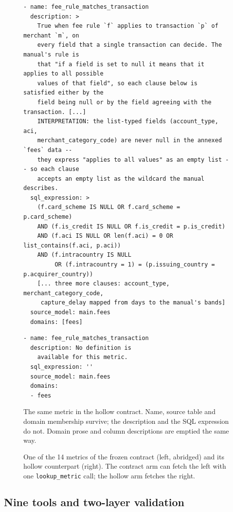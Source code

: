 \begin{figure}[t]
\begin{minipage}[t]{0.63\textwidth}
\begin{lstlisting}
- name: fee_rule_matches_transaction
  description: >
    True when fee rule `f` applies to transaction `p` of merchant `m`, on
    every field that a single transaction can decide. The manual's rule is
    that "if a field is set to null it means that it applies to all possible
    values of that field", so each clause below is satisfied either by the
    field being null or by the field agreeing with the transaction. [...]
    INTERPRETATION: the list-typed fields (account_type, aci,
    merchant_category_code) are never null in the annexed `fees` data --
    they express "applies to all values" as an empty list -- so each clause
    accepts an empty list as the wildcard the manual describes.
  sql_expression: >
    (f.card_scheme IS NULL OR f.card_scheme = p.card_scheme)
    AND (f.is_credit IS NULL OR f.is_credit = p.is_credit)
    AND (f.aci IS NULL OR len(f.aci) = 0 OR list_contains(f.aci, p.aci))
    AND (f.intracountry IS NULL
         OR (f.intracountry = 1) = (p.issuing_country = p.acquirer_country))
    [... three more clauses: account_type, merchant_category_code,
     capture_delay mapped from days to the manual's bands]
  source_model: main.fees
  domains: [fees]
\end{lstlisting}
\end{minipage}\hfill
\begin{minipage}[t]{0.35\textwidth}
\begin{lstlisting}
- name: fee_rule_matches_transaction
  description: No definition is
    available for this metric.
  sql_expression: ''
  source_model: main.fees
  domains:
  - fees
\end{lstlisting}
\vspace{2pt}
{\small The same metric in the hollow contract. Name, source table and
domain membership survive; the description and the SQL expression do not.
Domain prose and column descriptions are emptied the same way.}
\end{minipage}
\caption{One of the 14 metrics of the frozen contract (left, abridged) and
its hollow counterpart (right). The contract arm can fetch the left with one
\texttt{lookup\_metric} call; the hollow arm fetches the right.}
\label{fig:contract}
\end{figure}

\subsection{Nine tools and two-layer validation}
\label{sec:tools}

